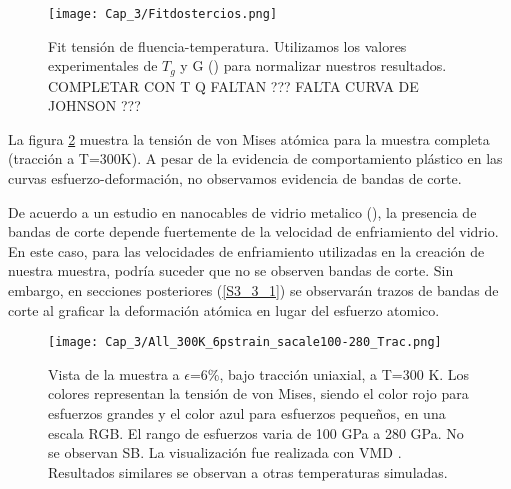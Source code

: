 \begin{figure}[htp]
\centering
\texttt{[image: Cap\_3/Fitdostercios.png]}
\caption[Fit tensión de fluencia-temperatura.]{Fit tensión de fluencia-temperatura. Utilizamos los valores experimentales de $T_g$ y G (\cite{johnson05}) para normalizar nuestros resultados. COMPLETAR CON T Q FALTAN ??? FALTA CURVA DE JOHNSON ???}
\label{C3:fg:fitDosTercios}
\end{figure}

La figura \ref{C3:fg:sampleTen} muestra la tensión de von Mises atómica para la muestra completa (tracción a T=300K). A pesar de la evidencia de comportamiento plástico en las curvas esfuerzo-deformación, no observamos evidencia de bandas de corte.


De acuerdo a un estudio en nanocables de vidrio metalico (\cite{xiao12}), la presencia de bandas de corte depende fuertemente de la velocidad de enfriamiento del vidrio. En este caso, para las velocidades de enfriamiento utilizadas en la creación de nuestra muestra, podría suceder que no se observen bandas de corte. Sin embargo, en secciones posteriores (\ref{S3_3_1}) se observarán trazos de bandas de corte al graficar la deformación atómica en lugar del esfuerzo atomico.


\begin{figure}[htp]
\centering
\texttt{[image: Cap\_3/All\_300K\_6pstrain\_sacale100-280\_Trac.png]}
\caption[Vista de la muestra a $\epsilon$=6\%, bajo tracción uniaxial, a T=300 K.]{Vista de la muestra a $\epsilon$=6\%, bajo tracción uniaxial, a T=300 K. Los colores representan la tensión de von Mises, siendo el color rojo para esfuerzos grandes y el color azul para esfuerzos pequeños, en una escala RGB. El rango de esfuerzos varia de 100 GPa a 280 GPa. No se observan SB. La visualización fue realizada con VMD \citep{humphrey96}. Resultados similares se observan a otras temperaturas simuladas.}
\label{C3:fg:sampleTen}
\end{figure}

